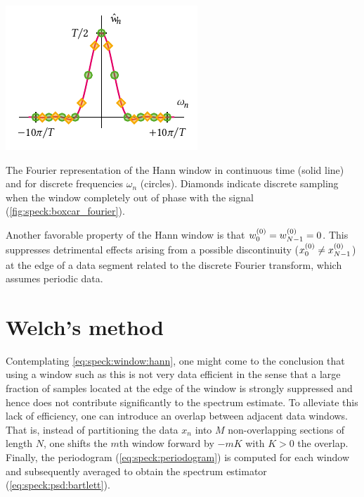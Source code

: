 \begin{marginfigure}
    \centering
    \includegraphics{img/pdf/spectrometer/hann}
    \caption[]{
        The Fourier representation of the Hann window in continuous time (solid line) and for discrete frequencies $\omega_n$ (circles).
        Diamonds indicate discrete sampling when the window completely out of phase with the signal (\cf \cref{fig:speck:boxcar_fourier}).
    }
    \label{fig:speck:hann_fourier}
\end{marginfigure}

Another favorable property of the Hann window is that $w_0^{(0)} = w_{N-1}^{(0)} = 0$.
This suppresses detrimental effects arising from a possible discontinuity ($x_0^{(0)}\neq x_{N-1}^{(0)}$) at the edge of a data segment related to the discrete Fourier transform, which assumes periodic data.

\section{Welch's method}\label{sec:speck:theory:welch}
Contemplating \cref{eq:speck:window:hann}, one might come to the conclusion that using a window such as this is not very data efficient in the sense that a large fraction of samples located at the edge of the window is strongly suppressed and hence does not contribute significantly to the spectrum estimate.
To alleviate this lack of efficiency, one can introduce an overlap between adjacent data windows.
That is, instead of partitioning the data $x_n$ into $M$ non-overlapping sections of length $N$, one shifts the $m$th window forward by $-mK$ with $K>0$ the overlap.
Finally, the periodogram (\cref{eq:speck:periodogram}) is computed for each window and subsequently averaged to obtain the spectrum estimator (\cref{eq:speck:psd:bartlett}).

